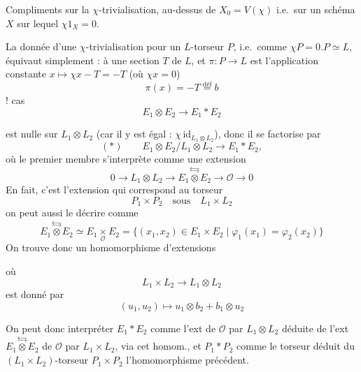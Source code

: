 \documentclass[11pt,a4paper]{article}
\begin{document}
Compliments sur la $\chi$-trivialisation, au-dessus de $X_0 = V(\chi)$ i.e.\ sur un schéma $X$ sur lequel $\chi 1_X = 0$.

La donnée d'une $\chi$-trivialisation pour un $L$-torseur $P$, i.e.\ comme $\chi P = 0 . P \simeq L$, équivaut simplement : à une section $T$ de $L$, et $\pi : P \to L$ est l'application constante $x \mapsto \chi x - T = -T$ (où $\chi x = 0$)
\[
  \pi(x) = -T \overset{\text{déf}}{=} b
\]
 !  cas
\[
  E_1 \otimes E_2 \to E_1 * E_2
\]

est nulle sur  $L_1 \otimes L_2$ (car il y est égal : $\chi\, \mathrm{id}_{L_1 \otimes L_2}$), donc il se factorise par
\[
  (*) \qquad E_1 \otimes E_2 / L_1 \otimes L_2 \longrightarrow E_1 * E_2 ,
\]
où le premier membre s'interprète comme une extension
\[
  0 \to L_1 \otimes L_2 \to E_1 \overset{\leftrightarrows}{\otimes} E_2 \to \mathcal{O} \to 0
\]
En fait, c'est l'extension qui correspond au torseur
\[
  P_1 \times P_2 \quad \text{sous} \quad L_1 \times L_2
\]
on peut aussi le décrire comme
\[
  E_1 \overset{\leftrightarrows}{\otimes} E_2 \simeq E_1 \underset{\mathcal{O}}{\times} E_2 = \{ (x_1, x_2) \in E_1 \times E_2 \mid \varphi_1(x_1) = \varphi_2(x_2) \}
\]
On trouve donc un homomorphisme d'extensions


où
\[
  L_1 \times L_2 \longrightarrow L_1 \otimes L_2
\]
est donné par
\[
  (u_1, u_2) \longmapsto u_1 \otimes b_2 + b_1 \otimes u_2
\]

On peut donc interpréter $E_1 * E_2$ comme l'ext de $\mathcal{O}$ par $L_1 \otimes L_2$ déduite de l'ext $E_1 \overset{\leftrightarrows}{\otimes} E_2$ de $\mathcal{O}$ par $L_1 \times L_2$, via cet homom., et $P_1 * P_2$ comme le torseur déduit du $(L_1 \times L_2)$-torseur $P_1 \times P_2$  l'homomorphisme précédent.
\end{document}
